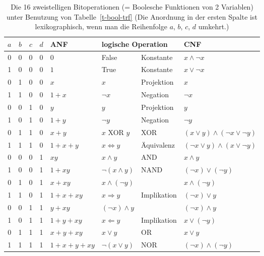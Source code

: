 \begin{refsegment}
\begin{table}[hbpt]
\begin{center}
  \begin{tabular}{|cccc|l|ll|l|} \hline
    $a$&$b$&$c$&$d$& ANF        & \multicolumn{2}{l|}{logische Operation} & CNF               \\ \hline\hline
     0 & 0 & 0 & 0 & $0$        & False     & Konstante                   & $x \wedge \neg x$ \\ \hline
     1 & 0 & 0 & 0 & $1$        & True      & Konstante                   & $x \vee \neg x$   \\ \hline
     0 & 1 & 0 & 0 & $x$        & $x$       & Projektion                  & $x$               \\ \hline
     1 & 1 & 0 & 0 & $1+x$      & $\neg x$  & Negation                    & $\neg x$          \\ \hline\hline
     0 & 0 & 1 & 0 & $y$        & $y$       & Projektion                  & $y$               \\ \hline
     1 & 0 & 1 & 0 & $1+y$      & $\neg y$  & Negation                    & $\neg y$          \\ \hline
     0 & 1 & 1 & 0 & $x+y$      & $x$ XOR $y$ & XOR & $(x \vee y) \wedge (\neg x \vee \neg y)$ \\ \hline
     1 & 1 & 1 & 0 & $1+x+y$    &$x\Longleftrightarrow y$& Äquivalenz &$(\neg x\vee y)\wedge(x\vee\neg y)$\\ \hline\hline
     0 & 0 & 0 & 1 & $xy$       & $x\wedge y$ & AND                       & $x\wedge y$       \\ \hline
     1 & 0 & 0 & 1 & $1+xy$     & $\neg(x\wedge y)$ & NAND                & $(\neg x)\vee(\neg y)$\\ \hline
     0 & 1 & 0 & 1 & $x+xy$     & $x\wedge(\neg y)$ &                     & $x\wedge(\neg y)$ \\ \hline
     1 & 1 & 0 & 1 & $1+x+xy$   & $x\Longrightarrow y$& Implikation       & $(\neg x)\vee y$  \\ \hline\hline
     0 & 0 & 1 & 1 & $y+xy$     & $(\neg x)\wedge y$ &                    & $(\neg x)\wedge y$\\ \hline
     1 & 0 & 1 & 1 & $1+y+xy$   & $x\Longleftarrow y$&  Implikation       & $x \vee (\neg y)$ \\ \hline
     0 & 1 & 1 & 1 & $x+y+xy$   & $x \vee y$ & OR                         & $x \vee y$        \\ \hline
     1 & 1 & 1 & 1 & $1+x+y+xy$ & $\neg(x\vee y)$& NOR              & $(\neg x)\wedge(\neg y)$\\ \hline
  \end{tabular}
\end{center}
\caption{Die 16 zweistelligen Bitoperationen (= Boolesche Funktionen von 2 Variablen)
   unter Benutzung von Tabelle~\ref{t-bool-trf} (Die Anordnung in der ersten Spalte ist
   lexikographisch, wenn man die Reihenfolge $a$, $b$, $c$, $d$ umkehrt.)}\label{tab-bool-2}
\end{table}


\end{refsegment}
